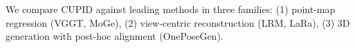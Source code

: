 \documentclass[../../book-main.tex]{subfiles}
\begin{document}
We compare CUPID against leading methods in three families: (1) point-map regression (VGGT, MoGe), (2) view-centric reconstruction (LRM, LaRa), (3) 3D generation with post-hoc alignment (OnePoseGen).






\end{document}

